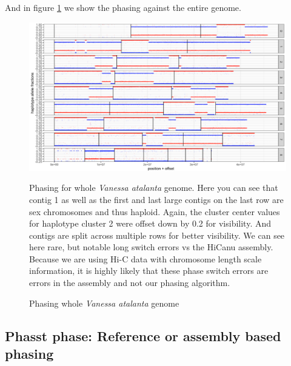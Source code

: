 \par{And in figure \ref{figure:hicphasing2} we show the phasing against the entire genome.

\begin{figure}[htbp!]

\caption{Phasing whole \textit{Vanessa atalanta} genome}
\label{figure:hicphasing2}
\begin{centering}
\includegraphics[width=\textwidth]{hicphasing2.png}
\par{Phasing for whole \textit{Vanessa atalanta} genome. Here you can see that contig 1 as well as the first and last large contigs on the last row are sex chromosomes and thus haploid. Again, the cluster center values for haplotype cluster 2 were offset down by 0.2 for visibility. And contigs are split across multiple rows for better visibility. We can see here rare, but notable long switch errors vs the HiCanu assembly. Because we are using Hi-C data with chromosome length scale information, it is highly likely that these phase switch errors are errors in the assembly and not our phasing algorithm. }
\end{centering}
\end{figure}

\subsection{Phasst phase: Reference or assembly based phasing}

}

